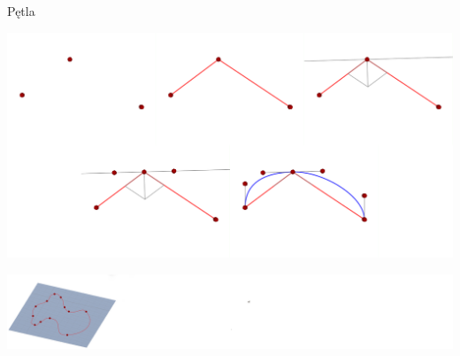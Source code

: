 \begin{frame}{Pętla}

	
	\includegraphics[width=\linewidth]{figures/loop_creation.png}

	\includegraphics[width=\linewidth]{figures/terrain_creation_1_2.png}

\end{frame}

